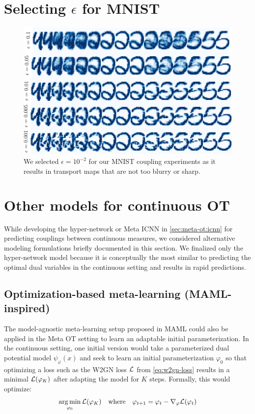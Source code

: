 \documentclass{article}
\begin{document}
\section{Selecting $\epsilon$ for MNIST}
\label{app:mnist-eps}
\begin{figure}[h]
  \centering
  \includegraphics[width=\textwidth]{fig/mnist-epsilons.pdf}
  \caption{We selected $\epsilon=10^{-2}$ for our MNIST coupling
    experiments as it results in transport maps that are not
    too blurry or sharp.}
  \label{fig:mnist-epsilon}
\end{figure}

\section{Other models for continuous OT}
\label{app:other-W2-models}
While developing the hyper-network or Meta ICNN in \cref{sec:meta-ot:icnn}
for predicting couplings between continuous measures, we considered
alternative modeling formulations briefly documented in this section.
We finalized only the hyper-network model because it is conceptually the
most similar to predicting the optimal dual variables in the continuous setting
and results in rapid predictions.

\subsection{Optimization-based meta-learning (MAML-inspired)}
The model-agnostic meta-learning setup proposed in MAML \citep{pmlr-v70-finn17a}
could also be applied in the Meta OT setting to learn an adaptable
initial parameterization.
In the continuous setting, one initial version would take a parameterized
dual potential model $\psi_\varphi(x)$ and seek to learn an initial
parameterization $\varphi_0$ so that optimizing a loss such as the
W2GN loss ${\mathcal{L}}$ from \cref{eq:w2gn-loss} results in a minimal
${\mathcal{L}}(\varphi_K)$ after adapting the model for $K$ steps.
Formally, this would optimize:
\begin{equation}
  \operatorname*{arg\,min}_{\varphi_0} {\mathcal{L}}(\varphi_K)\quad \text{where}\quad \varphi_{t+1}=\varphi_t-\nabla_\varphi{\mathcal{L}}(\varphi_t)
  \label{eq:maml-meta-ot}
\end{equation}
\end{document}
